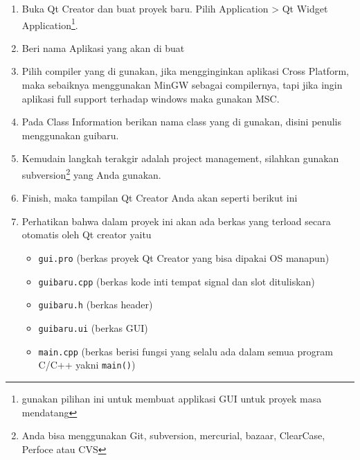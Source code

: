 \begin{enumerate}
	\item Buka Qt Creator dan buat proyek baru. Pilih Application \textgreater{} Qt Widget Application\footnote{gunakan pilihan ini untuk membuat applikasi GUI untuk proyek masa mendatang}.
	
		
		\item Beri nama Aplikasi yang akan di buat
		
		
		\item Pilih compiler yang di gunakan, jika mengginginkan aplikasi Cross Platform, maka sebaiknya menggunakan MinGW sebagai compilernya, tapi jika ingin aplikasi full support terhadap windows maka gunakan MSC.
		
		
		\item  Pada Class Information berikan nama class yang di gunakan, disini penulis menggunakan guibaru.
		
		
		\item Kemudain langkah terakgir adalah project management, silahkan gunakan subversion\footnote{Anda bisa menggunakan Git, subversion, mercurial, bazaar, ClearCase, Perfoce atau CVS} yang Anda gunakan.
		
		
		\item Finish, maka tampilan Qt Creator Anda akan seperti berikut ini
		
		
		\item Perhatikan bahwa dalam proyek ini akan ada berkas yang terload secara otomatis oleh Qt creator yaitu
		
		\begin{itemize}
			\item \texttt{gui.pro} (berkas proyek Qt Creator yang bisa dipakai OS manapun)
			\item  \texttt{guibaru.cpp} (berkas kode inti tempat signal dan slot dituliskan)
			\item \texttt{guibaru.h} (berkas header)
			\item \texttt{guibaru.ui} (berkas GUI)
			\item \texttt{main.cpp} (berkas berisi fungsi yang selalu ada dalam semua program C/C++ yakni \texttt{main()})
			
		\end{itemize}
	
\end{enumerate}

